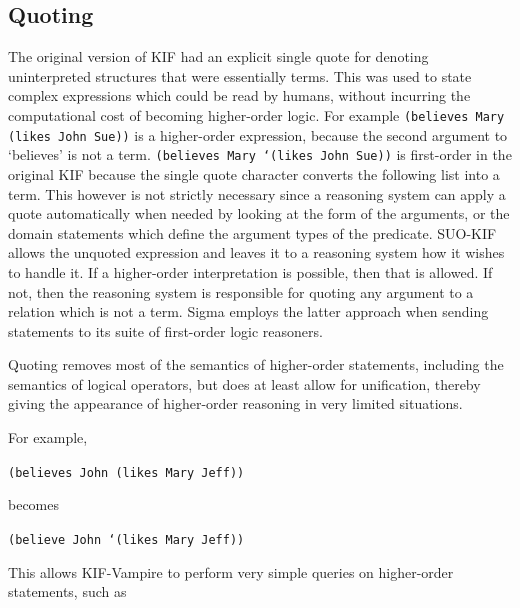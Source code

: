 \documentclass{book}
\begin{document}
\subsection{Quoting}
\label{chap:KnowRep:subsec:Quote}

The original version of KIF had an explicit single quote for denoting
uninterpreted structures that were essentially terms.  This was used to state
complex expressions which could be read by humans, without incurring the
computational cost of becoming higher-order logic.  For
example {\tt (believes Mary (likes John Sue))} is a higher-order expression,
because the second argument to ‘believes’ is not a term. {\tt (believes Mary
‘(likes John Sue))} is first-order in the original KIF because the single
quote character converts the following list into a term.  This however is not
strictly necessary since a reasoning system can apply a quote automatically when
needed by looking at the form of the arguments, or the domain statements which
define the argument types of the predicate.  SUO-KIF allows the unquoted
expression and leaves it to a reasoning system how it wishes to handle it.  If a
higher-order interpretation is possible, then that is allowed.  If not, then the
reasoning system is responsible for quoting any argument to a relation which is
not a term.  Sigma employs the latter approach when sending statements to its
suite of first-order logic reasoners.

Quoting removes most of the semantics of higher-order statements, including the
semantics of logical operators, but does at least allow for unification, thereby
giving the appearance of higher-order reasoning in very limited situations.

For example,

\vspace{4pt}

{\tt (believes John (likes Mary Jeff))}

\vspace{4pt}

becomes

\vspace{4pt}

{\tt (believe John `(likes Mary Jeff))}

\vspace{4pt}

This allows KIF-Vampire to perform very simple queries on higher-order
statements, such as

\vspace{4pt}
\end{document}
